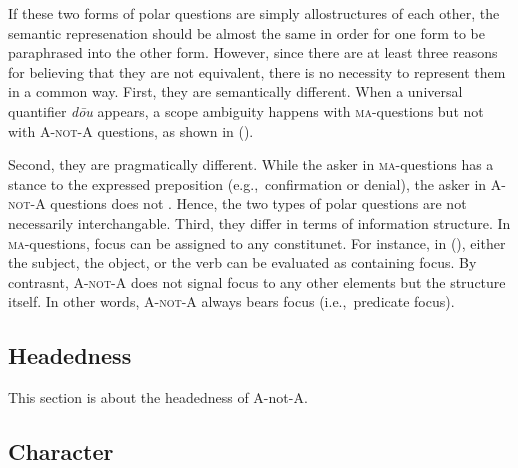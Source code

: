 \documentclass[11pt]{article}
\def\anota{\textsc{A-not-A}}
\newcommand{\myref}[1]{(\getref{#1})}
\begin{document}
\noindent If these two forms of polar questions are simply
allostructures of each other, the semantic represenation should be
almost the same in order for one form to be paraphrased into the other
form. However, since there are at least three reasons for believing
that they are not equivalent, there is no necessity to represent them
in a common way.  First, they are semantically different.  When a
universal quantifier \textit{d\={o}u} appears, a scope ambiguity
happens with \textsc{ma}-questions but not with {\anota} questions, as
shown in \myref{exe:scope}.


{\small 
{}}
\vspace{-20pt}

\noindent Second, they are pragmatically different. While the asker in
\textsc{ma}-questions has a stance to the expressed preposition
(e.g.,\ confirmation or denial), the asker in {\anota} questions does
not \cite{liing:14}. Hence, the two types of polar questions are not
necessarily interchangable. Third, they differ in terms of information
structure. In \textsc{ma}-questions, focus can be assigned to any
constitunet. For instance, in \myref{exe:yesno}, either the subject,
the object, or the verb can be evaluated as containing focus. By
contrasnt, {\anota} does not signal focus to any other elements but
the structure itself. In other words, {\anota} always bears focus
(i.e.,\ predicate focus).


\subsection{Headedness}
\label{ssec:head}

This section is about the headedness of A-not-A.

\subsection{Character}
\label{ssec:char}
\end{document}
